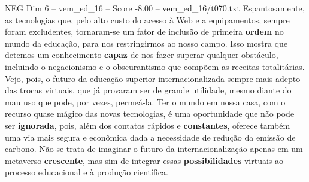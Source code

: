 \begin{textsample}{NEG Dim 6 – vem\_ed\_16 – Score -8.00 – vem\_ed\_16/t070.txt}
Espantosamente, as tecnologias que, pelo alto custo do acesso à Web e a equipamentos, sempre foram excludentes, tornaram-se um fator de inclusão de primeira \textbf{ordem} no mundo da educação, para nos restringirmos ao nosso campo.
Isso mostra que detemos um conhecimento \textbf{capaz} de nos fazer superar qualquer obstáculo, incluindo o negacionismo e o obscurantismo que compõem as receitas totalitárias.
Vejo, pois, o futuro da educação superior internacionalizada sempre mais adepto das trocas virtuais, que já provaram ser de grande utilidade, mesmo diante do mau uso que pode, por vezes, permeá-la.
Ter o mundo em nossa casa, com o recurso quase mágico das novas tecnologias, é uma oportunidade que não pode ser \textbf{ignorada}, pois, além dos contatos rápidos e \textbf{constantes}, oferece também uma via mais segura e econômica dada a necessidade de redução da emissão de carbono.
Não se trata de imaginar o futuro da internacionalização apenas em um metaverso \textbf{crescente}, mas sim de integrar essas \textbf{possibilidades} virtuais ao processo educacional e à produção científica.

\end{textsample}
